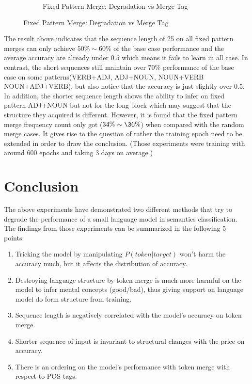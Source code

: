\documentclass[12pt]{article}
\begin{document}
\begin{figure} [!h]
\begin{center}
\begin{subfigure}[h]{0.4\linewidth}
\caption{Fixed Pattern Merge: Degradation vs Merge Tag}
\label{fig:fixmergeScatter2}
\end{subfigure}
\end{center}
\end{figure}

The result above indicates that the sequence length of 25 on all fixed pattern merges can only achieve $50\%\sim60\%$ of the base case performance and the average accuracy are already under $0.5$ which means it fails to learn in all case. In contrast, the short sequences still maintain over $70\%$ performance of the base case on some patterns(VERB+ADJ, ADJ+NOUN, NOUN+VERB NOUN+ADJ+VERB), but also notice that the accuracy is just slightly over $0.5$. In addition, the shorter sequence length shows the ability to infer on fixed pattern ADJ+NOUN but not for the long block which may suggest that the structure they acquired is different. However, it is found that the fixed pattern merge frequency count only got ($34\%\sim\36\%$) when compared with the random merge cases. It gives rise to the question of rather the training epoch need to be extended in order to draw the conclusion. (Those experiments were training with around 600 epochs and taking 3 days on average.)   

\section{Conclusion}

The above experiments have demonstrated two different methods that try to degrade the performance of a small language model in semantics classification. The findings from those experiments can be summarized in the following 5 points:
\begin{enumerate}
    \item Tricking the model by manipulating $P(token|target)$ won't harm the accuracy much, but it affects the distribution of accuracy.
    \item Destroying language structure by token merge is much more harmful on the model to infer mental concepts (good/bad), thus giving support on language model do form structure from training. 
    \item Sequence length is negatively correlated with the model's accuracy on token merge.
    \item Shorter sequence of input is invariant to structural changes with the price on accuracy.
    \item There is an ordering on the model's performance with token merge with respect to POS tags.
\end{enumerate}
\end{document}

